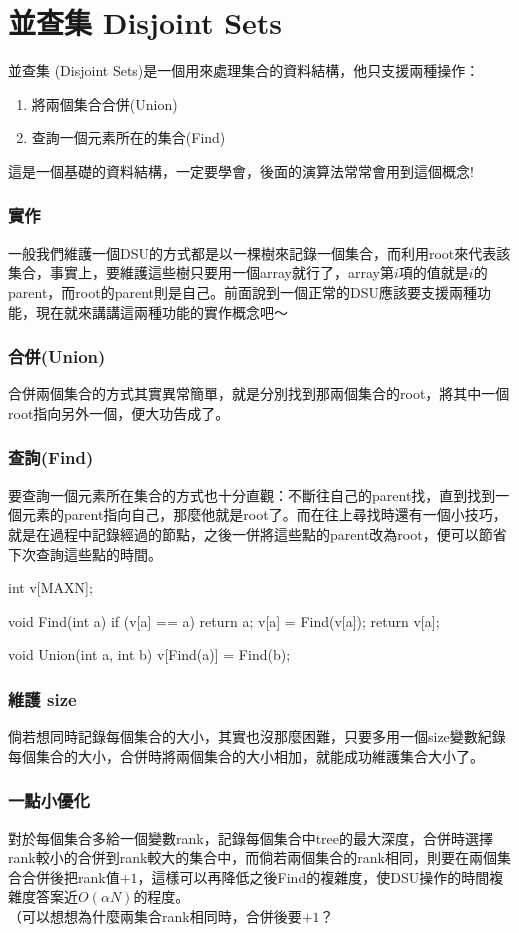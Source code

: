 \documentclass[main.tex]{subfiles}
\begin{document}
\chapter{並查集 Disjoint Sets}
	並查集 (Disjoint Sets)是一個用來處理集合的資料結構，他只支援兩種操作：
	\begin{enumerate}
		\item 將兩個集合合併(Union)
		\item 查詢一個元素所在的集合(Find)
	\end{enumerate}
	這是一個基礎的資料結構，一定要學會，後面的演算法常常會用到這個概念!
		
	\subsection{實作}
	一般我們維護一個DSU的方式都是以一棵樹來記錄一個集合，而利用root來代表該集合，事實上，要維護這些樹只要用一個array就行了，array第$i$項的值就是$i$的parent，而root的parent則是自己。前面說到一個正常的DSU應該要支援兩種功能，現在就來講講這兩種功能的實作概念吧～
	\subsection{合併(Union)}
	合併兩個集合的方式其實異常簡單，就是分別找到那兩個集合的root，將其中一個root指向另外一個，便大功告成了。
	\subsection{查詢(Find)}
	要查詢一個元素所在集合的方式也十分直觀：不斷往自己的parent找，直到找到一個元素的parent指向自己，那麼他就是root了。而在往上尋找時還有一個小技巧，就是在過程中記錄經過的節點，之後一併將這些點的parent改為root，便可以節省下次查詢這些點的時間。
	\begin{C++}
int v[MAXN];

void Find(int a) {
	if (v[a] == a) return a;
	v[a] = Find(v[a]);
	return v[a];
}

void Union(int a, int b) {
	v[Find(a)] = Find(b);
}
	\end{C++}
	\subsection{維護 size}
	倘若想同時記錄每個集合的大小，其實也沒那麼困難，只要多用一個size變數紀錄每個集合的大小，合併時將兩個集合的大小相加，就能成功維護集合大小了。
	\subsection{一點小優化}
	對於每個集合多給一個變數rank，記錄每個集合中tree的最大深度，合併時選擇rank較小的合併到rank較大的集合中，而倘若兩個集合的rank相同，則要在兩個集合合併後把rank值$+1$，這樣可以再降低之後Find的複雜度，使DSU操作的時間複雜度答案近$O(\alpha{N})$的程度。\\
	（可以想想為什麼兩集合rank相同時，合併後要$+1$？

	
\end{document}
